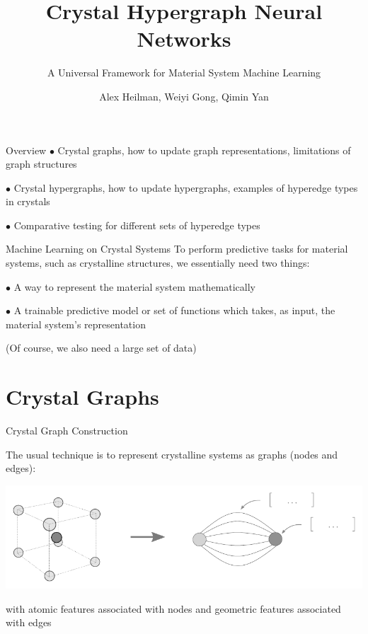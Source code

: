 \documentclass[11pt]{beamer}
\author{Alex Heilman, Weiyi Gong, Qimin Yan}
\title{Crystal Hypergraph Neural Networks}
\subtitle{A Universal Framework for Material System Machine Learning}
\institute{Northeastern University}
\begin{document}
\begin{frame}
\titlepage
\end{frame}


\begin{frame}{Overview}
$\bullet$ Crystal graphs\pause , how to update graph representations\pause , limitations of graph structures

\vspace{0.6cm}\pause

$\bullet$ Crystal hypergraphs\pause , how to update hypergraphs\pause , examples of hyperedge types in crystals

\vspace{0.6cm}\pause

$\bullet$ Comparative testing for different sets of hyperedge types
\end{frame}

\begin{frame}{Machine Learning on Crystal Systems}
To perform predictive tasks for material systems, such as crystalline structures, we essentially need two things:\pause

\medskip

$\bullet$ A way to represent the material system mathematically\pause

\medskip

$\bullet$ A trainable predictive model or set of functions which takes, as input, the material system's representation

\medskip\pause

(Of course, we also need a large set of data)
\end{frame}


\section{Crystal Graphs}
\begin{frame}{Crystal Graph Construction}

The usual technique is to represent crystalline systems as graphs (nodes and edges):

\medskip

\begin{center}

\includegraphics[scale=0.7]{crystalgraph.pdf}\pause
\end{center}

with atomic features associated with nodes and geometric features associated with edges

\end{frame}
\end{document}
